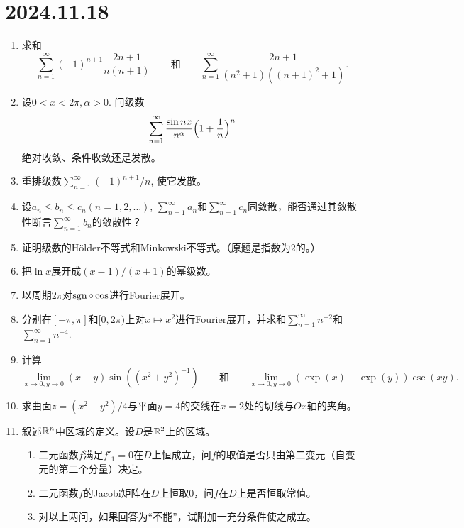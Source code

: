 \section*{2024.11.18}
\begin{enumerate}
    \item 求和\begin{equation*}
        \sum_{n=1}^{\infty}(-1)^{n+1}\frac{2n+1}{n(n+1)}\qquad\text{和}\qquad\sum_{n=1}^{\infty}\frac{2n+1}{(n^2+1)((n+1)^2+1)}.
    \end{equation*}
    \item 设$0<x<2\pi, \alpha>0$. 问级数\begin{equation*}
        \sum_{n=1}^{\infty}\frac{\sin nx}{n^{\alpha}}\Bigl(1+\frac{1}{n}\Bigr)^n
    \end{equation*}绝对收敛、条件收敛还是发散。%
    \item 重排级数$\sum_{n=1}^{\infty}(-1)^{n+1}/n$, 使它发散。
    \item 设$a_n\leqslant b_n\leqslant c_n(n=1,2,\dots)$, $\sum_{n=1}^{\infty}a_n$和$\sum_{n=1}^{\infty}c_n$同敛散，能否通过其敛散性断言$\sum_{n=1}^{\infty}b_n$的敛散性？
    \item 证明级数的H\"older不等式和Minkowski不等式。（原题是指数为2的。）
    \item 把$\ln x$展开成$(x-1)/(x+1)$的幂级数。
    \item 以周期$2\pi$对$\operatorname{sgn}\circ\cos$进行Fourier展开。
    \item 分别在$[-\pi,\pi]$和$[0,2\pi)$上对$x\mapsto x^2$进行Fourier展开，并求和$\sum_{n=1}^{\infty}n^{-2}$和$\sum_{n=1}^{\infty}n^{-4}$.
    \item 计算\begin{equation*}
        \lim_{x\to 0,y\to 0}(x+y)\sin ((x^2+y^2)^{-1})\qquad\text{和}\qquad\lim_{x\to 0,y\to 0}(\exp(x)-\exp(y))\csc(xy).
    \end{equation*}
    \item 求曲面$z=(x^2+y^2)/4$与平面$y=4$的交线在$x=2$处的切线与$Ox$轴的夹角。
    \item 叙述$\mathbb{R}^n$中区域的定义。设$D$是$\mathbb{R}^2$上的区域。
    \begin{enumerate}
        \item 二元函数$f$满足$f'_1=0$在$D$上恒成立，问$f$的取值是否只由第二变元（自变元的第二个分量）决定。
        \item 二元函数$f$的Jacobi矩阵在$D$上恒取0，问$f$在$D$上是否恒取常值。
        \item 对以上两问，如果回答为“不能”，试附加一充分条件使之成立。

\end{enumerate}
\end{enumerate}
